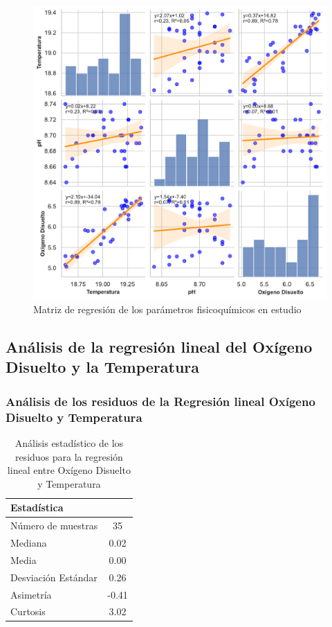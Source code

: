 \begin{figure}[!htb]
    \centering
    \includegraphics[width=1\linewidth]{Figuras_AED/matriz_de_pares_regresion_colores_fuertes.pdf}
    \caption{Matriz de regresión de los parámetros fisicoquímicos en estudio}
    \label{fig:enter-matriz_regre}
\end{figure}

\subsection{Análisis de la regresión lineal del Oxígeno Disuelto y la Temperatura}


\subsubsection{Análisis de los residuos de la Regresión lineal Oxígeno Disuelto y  Temperatura}
\begin{table}[ht]
\centering
\caption{Análisis estadístico de los residuos para la regresión lineal entre Oxígeno Disuelto y Temperatura}
\label{tab:residual_statistics}
\begin{tabular}{@{}lc@{}}
\toprule
\textbf{Estadística} & \textbf{ } \\
\midrule
Número de muestras & 35 \\
Mediana & 0.02 \\
Media & 0.00 \\
Desviación Estándar & 0.26 \\
Asimetría & -0.41 \\
Curtosis & 3.02 \\
\bottomrule
\end{tabular}
\end{table}

